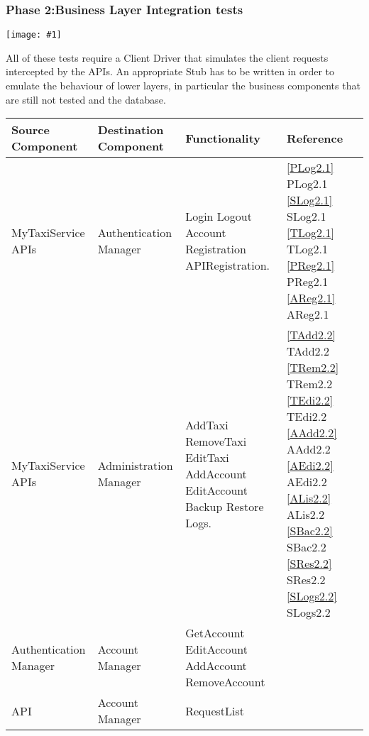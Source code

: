 \documentclass[11pt, a4paper,titlepage]{article}
\newcommand{\image}[1]{
	\begin{center}
		\noindent \texttt{[image: \#1]}
	\end{center}
}
\begin{document}
	\subsubsection{Phase 2:Business Layer Integration tests}
	\image{test_phase2.png}	
	All of these tests require a Client Driver that simulates the client requests intercepted by the APIs. An appropriate Stub has to be written in order to emulate the behaviour of lower layers, in particular the business components that are still not tested and the database.
	\newline
	\newline
	\begin{tabularx}{\textwidth}{| X |X |X |X|}
		\hline \textbf{Source Component} &\textbf{Destination Component}&\textbf{Functionality} & \textbf{Reference} \\
		\hline MyTaxiService APIs & Authentication Manager & 
		Login\newline
		Logout\newline
		Account Registration\newline
		APIRegistration.
		& \ref{PLog2.1} PLog2.1 \newline \ref{SLog2.1} SLog2.1 \newline \ref{TLog2.1} TLog2.1 \newline \ref{PReg2.1} PReg2.1 \newline \ref{AReg2.1} AReg2.1
		\\
		\hline MyTaxiService APIs & Administration Manager &  
		AddTaxi\newline
		RemoveTaxi\newline
		EditTaxi\newline
		AddAccount\newline
		EditAccount\newline
		Backup\newline
		Restore\newline
		Logs.
		&
		\ref{TAdd2.2} TAdd2.2 \newline
		\ref{TRem2.2} TRem2.2 \newline
		\ref{TEdi2.2} TEdi2.2 \newline
		\ref{AAdd2.2} AAdd2.2 \newline
		\ref{AEdi2.2} AEdi2.2 \newline
		\ref{ALis2.2} ALis2.2 \newline
		\ref{SBac2.2} SBac2.2 \newline
		\ref{SRes2.2} SRes2.2 \newline
		\ref{SLogs2.2} SLogs2.2 \newline
		\\
		\hline Authentication Manager & Account Manager & 
		GetAccount\newline
		EditAccount\newline
		AddAccount\newline
		RemoveAccount\newline
		&\\
			\hline API & Account Manager & 
			RequestList
			&\\
		\hline
	\end{tabularx}
\end{document}
